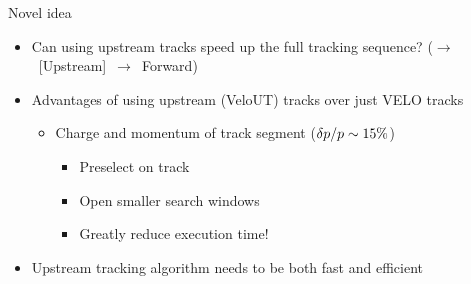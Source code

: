 \documentclass[aspectratio=1610]{beamer}
\begin{document}




\begin{frame}{Novel idea}
\begin{itemize}
  \item Can using upstream tracks speed up the full tracking sequence? \mbox{(\velo $\to$ [Upstream] $\to$ Forward)}
\end{itemize}
\begin{itemize}
  \item Advantages of using upstream (VeloUT) tracks over just VELO tracks
    \begin{itemize}
      \item Charge and momentum of track segment ($\delta \mbox{$p$}/\mbox{$p$} \sim 15 \%$)
      \begin{itemize}
        \item[\ding{212}] Preselect on track \pt
        \item[\ding{212}] Open smaller search windows
        \item[\ding{70}] Greatly reduce execution time!
      \end{itemize}
    \end{itemize}
  \end{itemize}

  \begin{center}
  
  \end{center}

  \begin{itemize}
    \item Upstream tracking algorithm needs to be both fast and efficient
  \end{itemize}
\end{frame}
\end{document}
